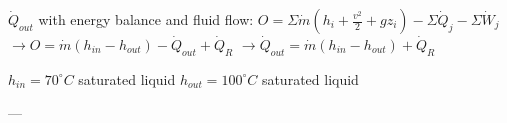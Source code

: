 \( \dot{Q}_{out} \) with energy balance and fluid flow:  
\( O = \Sigma \dot{m} (h_i + \frac{v^2}{2} + gz_i) - \Sigma \dot{Q}_j - \Sigma \dot{W}_j \)  
\( \rightarrow O = \dot{m} (h_{in} - h_{out}) - \dot{Q}_{out} + \dot{Q}_R \)  
\( \rightarrow \dot{Q}_{out} = \dot{m} (h_{in} - h_{out}) + \dot{Q}_R \)  

\( h_{in} = 70^\circ C \) saturated liquid  
\( h_{out} = 100^\circ C \) saturated liquid  

---